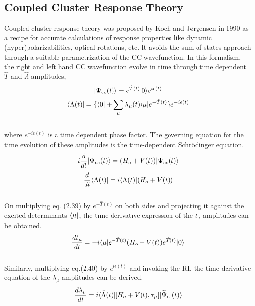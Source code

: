 \subsection{Coupled Cluster Response Theory}
Coupled cluster response theory was proposed by Koch and J{\o}rgensen in 1990\cite{Koch90} as a recipe
for accurate calculations of response properties like dynamic (hyper)polarizabilities, optical
rotations, etc. It avoids the sum of states approach through a suitable parametrization of the CC wavefunction.
In this formalism, the right and left hand CC wavefunction evolve in time through time dependent $\hat{T}$
and $\hat{\Lambda}$ amplitudes,\cite{Koch90}
\\
\begin{equation}
| \Psi_{cc}(t) \rangle = e^{\hat{T}(t)}| 0 \rangle e^{i\epsilon(t)}
\end{equation}
\begin{equation} \langle \Lambda(t) | = \{\langle 0 | +
\sum_{\mu}\lambda_\mu(t)\langle \mu |e^{-\hat{T}(t)}\}e^{-i\epsilon(t)}
\end{equation}
\\
where $e^{\pm i\epsilon(t)}$ is a time dependent phase factor. The governing equation for the time evolution of 
these amplitudes is the time-dependent Schr\"odinger equation.
\\
\begin{equation}
i\frac{d}{dt}| \Psi_{cc}(t) \rangle = (H_o + V(t))| \Psi_{cc}(t) \rangle 
\end{equation}
\begin{equation}
\frac{d}{dt}\langle \Lambda(t) | = i\langle \Lambda(t) |(H_o + V(t))
\end{equation}
\\
On multiplying eq. (2.39) by $e^{-\hat{T}(t)}$ on both sides and projecting 
it against the excited determinants $\langle \mu |$, the time derivative expression
of the $t_{\mu}$ amplitudes can be obtained.
\\
\begin{equation}
\frac{dt_{\mu}}{dt} = -i\langle \mu |e^{-\hat{T}(t)}(H_o + V(t))e^{\hat{T}(t)}| 0 \rangle
\end{equation}
\\
Similarly, multiplying eq.(2.40) by $e^{i\epsilon(t)}$ and invoking the RI, the time derivative 
equation of the $\lambda_{\mu}$ amplitudes can be derived.
\\
\begin{equation}
\frac{d\lambda_{\mu}}{dt} = i\langle {\tilde{\Lambda}}(t) |\lbrack H_o + V(t),\tau_\mu
\rbrack| {\widetilde{\Psi}_{cc}}(t) \rangle
\end{equation} 
